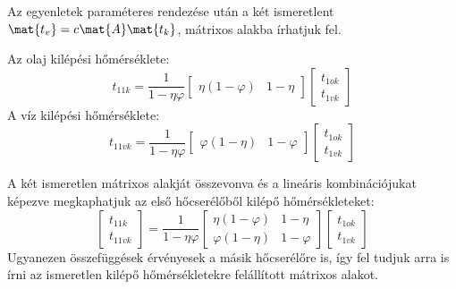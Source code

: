 Az egyenletek paraméteres rendezése után a két ismeretlent $\mat{t_v} = c \mat{A} \mat{t_k}$, mátrixos alakba írhatjuk fel.

Az olaj kilépési hőmérséklete:
\begin{equation*}
		t_{11k} = \dfrac{1}{1-\eta \varphi} 
	\begin{bmatrix}
		\eta (1- \varphi) & 1-\eta
	\end{bmatrix} 
	\begin{bmatrix}
		t_{1ok} \\
		t_{1vk}
	\end{bmatrix}
\end{equation*}
A víz kilépési hőmérséklete:
\begin{equation*}
		t_{11vk} = \dfrac{1}{1-\eta \varphi}
	\begin{bmatrix}
		\varphi(1-\eta) & 1-\varphi
	\end{bmatrix} 
	\begin{bmatrix}
		t_{1ok} \\
		t_{1vk}
	\end{bmatrix}
\end{equation*}

\pagebreak

A két ismeretlen mátrixos alakját összevonva és a lineáris kombinációjukat képezve megkaphatjuk az első hőcserélőből kilépő hőmérsékleteket:
\begin{equation*}
	\begin{bmatrix}
		{t_{11k}} \\
		{t_{11vk}}
	\end{bmatrix}
	=
	\dfrac{1}{1 - \eta \varphi}
	\begin{bmatrix}
		\eta(1-\varphi) & 1-\eta \\
		\varphi(1-\eta) & 1-\varphi
	\end{bmatrix}
	\begin{bmatrix}
		t_{1ok} \\
		t_{1vk}
	\end{bmatrix}
\end{equation*}
\noindent Ugyanezen összefüggések érvényesek a másik hőcserélőre is, így fel tudjuk arra is írni az ismeretlen kilépő hőmérsékletekre felállított mátrixos alakot.
